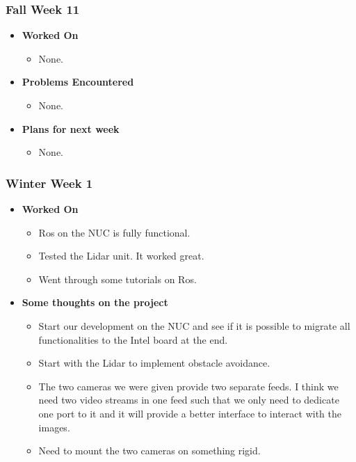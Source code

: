 \documentclass[compsoc,draftclsnofoot,onecolumn,10pt]{IEEEtran}
\begin{document}
\subsubsection{Fall Week 11}
\begin{itemize}
    \item {\textbf{Worked On}}
    \begin{itemize}
      \item None.
    \end{itemize}

    \item {\textbf{Problems Encountered}}
    \begin{itemize}
      \item None.
    \end{itemize}

    \item{\textbf{Plans for next week}}
    \begin{itemize}
      \item None.
    \end{itemize}

\end{itemize}

\subsubsection{Winter Week 1}
\begin{itemize}
    \item {\textbf{Worked On}}
    \begin{itemize}
      \item Ros on the NUC is fully functional.
      \item Tested the Lidar unit. It worked great.
      \item Went through some tutorials on Ros.
    \end{itemize}

    \item {\textbf{Some thoughts on the project}}
    \begin{itemize}
      \item Start our development on the NUC and see if it is possible to
      migrate all functionalities to the Intel board at the end.
      \item Start with the Lidar to implement obstacle avoidance.
      \item The two cameras we were given provide two separate feeds. I
      think we need two video streams in one feed such that we only need to
      dedicate one port to it and it will provide a better interface to
      interact with the images.
      \item Need to mount the two cameras on something rigid.
    \end{itemize}

\end{itemize}
\end{document}
